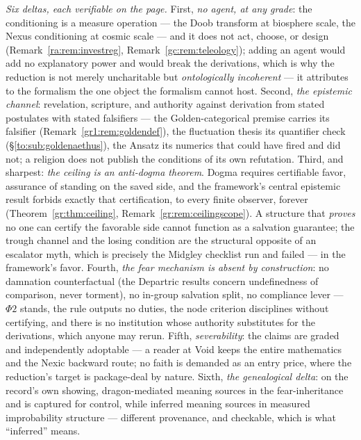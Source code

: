 \documentclass[11pt]{article}
\numberwithin{equation}{section}
\theoremstyle{plain}
\theoremstyle{definition}
\theoremstyle{remark}
\begin{document}
\emph{Six deltas, each verifiable on the page.} First, \emph{no
agent, at any grade}: the conditioning is a measure operation --- the
Doob transform at biosphere scale, the Nexus conditioning at cosmic
scale --- and it does not act, choose, or design
(Remark~\ref{ra:rem:investreg}, Remark~\ref{gc:rem:teleology});
adding an agent would add no explanatory power and would break the
derivations, which is why the reduction is not merely uncharitable
but \emph{ontologically incoherent} --- it attributes to the
formalism the one object the formalism cannot host. Second, \emph{the
epistemic channel}: revelation, scripture, and authority against
derivation from stated postulates with stated falsifiers --- the
Golden-categorical premise carries its falsifier
(Remark~\ref{gr1:rem:goldendef}), the fluctuation thesis its
quantifier check (\S\ref{to:sub:goldenaethus}), the Ansatz its
numerics that could have fired and did not; a religion does not
publish the conditions of its own refutation. Third, and sharpest:
\emph{the ceiling is an anti-dogma theorem}. Dogma requires
certifiable favor, assurance of standing on the saved side, and
the framework's central epistemic result forbids exactly that
certification, to every finite observer, forever
(Theorem~\ref{gr:thm:ceiling}, Remark~\ref{gr:rem:ceilingscope}). A
structure that \emph{proves} no one can certify the favorable side
cannot function as a salvation guarantee; the trough channel and the
losing condition are the structural opposite of an escalator myth,
which is precisely the Midgley checklist run and failed --- in the
framework's favor. Fourth, \emph{the fear mechanism is absent by
construction}: no damnation counterfactual (the Departric results
concern undefinedness of comparison, never torment), no in-group
salvation split, no compliance lever --- $\Phi2$ stands, the rule
outputs no duties, the node criterion disciplines without
certifying, and there is no institution whose authority substitutes
for the derivations, which anyone may rerun. Fifth,
\emph{severability}: the claims are graded and independently
adoptable --- a reader at Void keeps the entire mathematics and the
Nexic backward route; no faith is demanded as an entry price, where
the reduction's target is package-deal by nature. Sixth, \emph{the
genealogical delta}: on the record's own showing, dragon-mediated
meaning sources in the fear-inheritance and is captured for control,
while inferred meaning sources in measured improbability structure
--- different provenance, and checkable, which is what
``inferred'' means.
\end{document}
